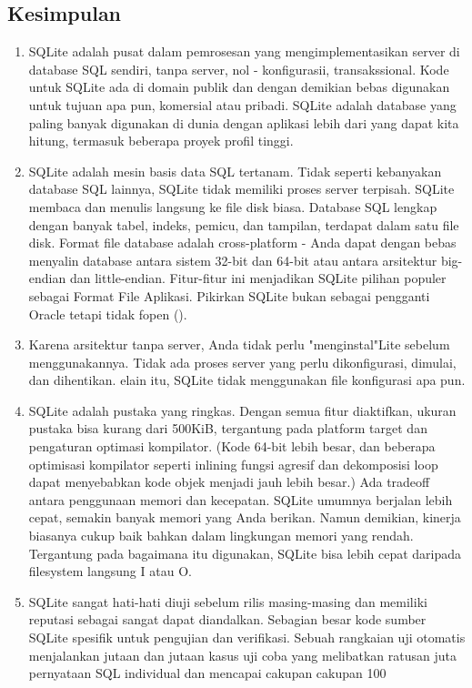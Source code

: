 		\subsection{Kesimpulan}
			\begin{enumerate}
				\item SQLite adalah pusat dalam pemrosesan yang mengimplementasikan server di database SQL sendiri, tanpa server, nol - konfigurasii, transakssional. Kode untuk SQLite ada di domain publik dan dengan demikian bebas digunakan untuk tujuan apa pun, komersial atau pribadi. SQLite adalah database yang paling banyak digunakan di dunia dengan aplikasi lebih dari yang dapat kita hitung, termasuk beberapa proyek profil tinggi.
				\item SQLite adalah mesin basis data SQL tertanam. Tidak seperti kebanyakan database SQL lainnya, SQLite tidak memiliki proses server terpisah. SQLite membaca dan menulis langsung ke file disk biasa. Database SQL lengkap dengan banyak tabel, indeks, pemicu, dan tampilan, terdapat dalam satu file disk. Format file database adalah cross-platform - Anda dapat dengan bebas menyalin database antara sistem 32-bit dan 64-bit atau antara arsitektur big-endian dan little-endian. Fitur-fitur ini menjadikan SQLite pilihan populer sebagai Format File Aplikasi. Pikirkan SQLite bukan sebagai pengganti Oracle tetapi tidak fopen ().
				\item Karena arsitektur tanpa server, Anda tidak perlu "menginstal"Lite sebelum menggunakannya. Tidak ada proses server yang perlu dikonfigurasi, dimulai, dan dihentikan. elain itu, SQLite tidak menggunakan file konfigurasi apa pun.
				\item SQLite adalah pustaka yang ringkas. Dengan semua fitur diaktifkan, ukuran pustaka bisa kurang dari 500KiB, tergantung pada platform target dan pengaturan optimasi kompilator. (Kode 64-bit lebih besar, dan beberapa optimisasi kompilator seperti inlining fungsi agresif dan dekomposisi loop dapat menyebabkan kode objek menjadi jauh lebih besar.) Ada tradeoff antara penggunaan memori dan kecepatan. SQLite umumnya berjalan lebih cepat, semakin banyak memori yang Anda berikan. Namun demikian, kinerja biasanya cukup baik bahkan dalam lingkungan memori yang rendah. Tergantung pada bagaimana itu digunakan, SQLite bisa lebih cepat daripada filesystem langsung I atau O.
				\item SQLite sangat hati-hati diuji sebelum rilis masing-masing dan memiliki reputasi sebagai sangat dapat diandalkan. Sebagian besar kode sumber SQLite spesifik untuk pengujian dan verifikasi. Sebuah rangkaian uji otomatis menjalankan jutaan dan jutaan kasus uji coba yang melibatkan ratusan juta pernyataan SQL individual dan mencapai cakupan cakupan 100%

\end{enumerate}
